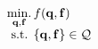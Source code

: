 





\begin{equation}
  \begin{array}{l}
    \operatorname*{min.}\limits_{\mathbf{q}, \mathbf{f}}{f(\mathbf{q}, \mathbf{f})}\\
    \text{ s.t. }\{\mathbf{q}, \mathbf{f}\}\in\mathcal{Q}
  \end{array}
\end{equation}

